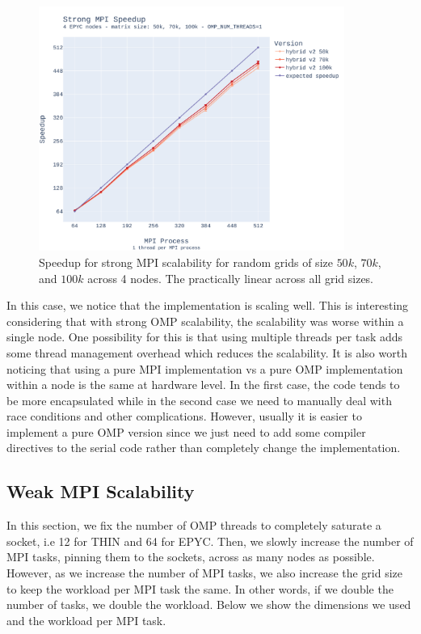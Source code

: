 \documentclass{report}
\begin{document}
\begin{figure}[H]
\centering
\includegraphics[width=10cm, height=8cm]{./images/strong_MPI_epyc_hybrid_grid_100k_speedup.pdf}
\caption{\label{fig:strongmpiepychybridspeedup} Speedup for strong MPI scalability 
for random grids of size $50k$, $70k$, and $100k$ across 4 nodes. The practically 
linear across all grid sizes.}
\end{figure}

In this case, we notice that the implementation is scaling well. This is interesting 
considering that with strong OMP scalability, the scalability was worse within 
a single node. One possibility for this is that using multiple threads per task 
adds some thread management overhead which reduces the scalability. It is also 
worth noticing that using a pure MPI implementation vs a pure OMP implementation 
within a node is the same at hardware level. In the first case, the code tends 
to be more encapsulated while in the second case we need to manually deal with 
race conditions and other complications. However, usually it is easier to implement 
a pure OMP version since we just need to add some compiler directives to the serial 
code rather than completely change the implementation.

\subsection{Weak MPI Scalability}

In this section, we fix the number of OMP threads to completely saturate a 
socket, i.e 12 for THIN and 64 for EPYC. Then, we slowly increase the number 
of MPI tasks, pinning them to the sockets, across as many nodes as possible. 
However, as we increase the number of MPI tasks, we also increase the grid 
size to keep the workload per MPI task the same. In other words, if we 
double the number of tasks, we double the workload. Below we show the 
dimensions we used and the workload per MPI task.
\end{document}
